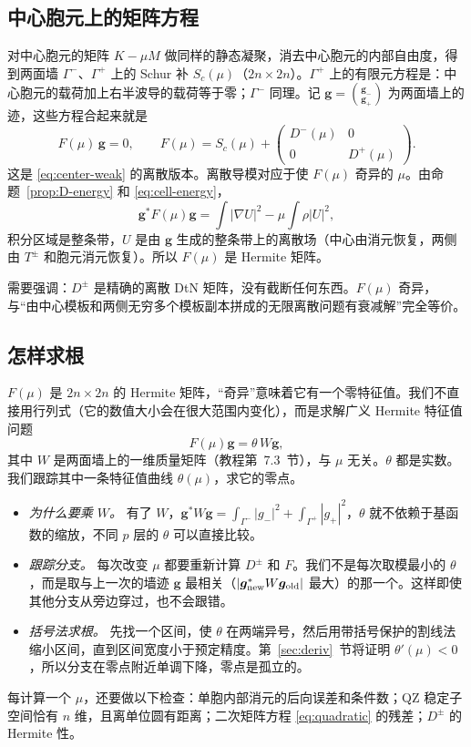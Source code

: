 \documentclass[11pt,a4paper,fontset=fandol]{ctexart}
\begin{document}
\subsection{中心胞元上的矩阵方程}

对中心胞元的矩阵 $K-\mu M$ 做同样的静态凝聚，消去中心胞元的内部自由度，得到两面墙 $\Gamma^-$、$\Gamma^+$ 上的 Schur 补 $S_c(\mu)$（$2n\times2n$）。$\Gamma^+$ 上的有限元方程是：中心胞元的载荷加上右半波导的载荷等于零；$\Gamma^-$ 同理。记 $\bm g=\binom{\bm g_-}{\bm g_+}$ 为两面墙上的迹，这些方程合起来就是
\begin{equation}
\label{eq:F}
F(\mu)\,\bm g=0,\qquad
F(\mu)=S_c(\mu)+\begin{pmatrix}D^-(\mu)&0\\0&D^+(\mu)\end{pmatrix}.
\end{equation}
这是 \eqref{eq:center-weak} 的离散版本。离散导模对应于使 $F(\mu)$ 奇异的 $\mu$。由命题~\ref{prop:D-energy} 和 \eqref{eq:cell-energy}，
\begin{equation}
\label{eq:F-energy}
\bm g^*F(\mu)\bm g=\int|\nabla U|^2-\mu\int\rho|U|^2 ,
\end{equation}
积分区域是整条带，$U$ 是由 $\bm g$ 生成的整条带上的离散场（中心由消元恢复，两侧由 $T^\pm$ 和胞元消元恢复）。所以 $F(\mu)$ 是 Hermite 矩阵。

需要强调：$D^\pm$ 是精确的离散 DtN 矩阵，没有截断任何东西。$F(\mu)$ 奇异，与“由中心模板和两侧无穷多个模板副本拼成的无限离散问题有衰减解”完全等价。

\subsection{怎样求根}
\label{sec:root}

$F(\mu)$ 是 $2n\times2n$ 的 Hermite 矩阵，“奇异”意味着它有一个零特征值。我们不直接用行列式（它的数值大小会在很大范围内变化），而是求解广义 Hermite 特征值问题
\begin{equation}
\label{eq:theta}
F(\mu)\bm g=\theta\,W\bm g ,
\end{equation}
其中 $W$ 是两面墙上的一维质量矩阵（教程第~7.3~节），与 $\mu$ 无关。$\theta$ 都是实数。我们跟踪其中一条特征值曲线 $\theta(\mu)$，求它的零点。

\begin{itemize}
\item \emph{为什么要乘 $W$。} 有了 $W$，$\bm g^*W\bm g=\int_{\Gamma^-}|g_-|^2+\int_{\Gamma^+}|g_+|^2$，$\theta$ 就不依赖于基函数的缩放，不同 $p$ 层的 $\theta$ 可以直接比较。
\item \emph{跟踪分支。} 每次改变 $\mu$ 都要重新计算 $D^\pm$ 和 $F$。我们不是每次取模最小的 $\theta$，而是取与上一次的墙迹 $\bm g$ 最相关（$|\bm g_{\rm new}^*W\bm g_{\rm old}|$ 最大）的那一个。这样即使其他分支从旁边穿过，也不会跟错。
\item \emph{括号法求根。} 先找一个区间，使 $\theta$ 在两端异号，然后用带括号保护的割线法缩小区间，直到区间宽度小于预定精度。第~\ref{sec:deriv}~节将证明 $\theta'(\mu)<0$，所以分支在零点附近单调下降，零点是孤立的。
\end{itemize}
每计算一个 $\mu$，还要做以下检查：单胞内部消元的后向误差和条件数；QZ 稳定子空间恰有 $n$ 维，且离单位圆有距离；二次矩阵方程 \eqref{eq:quadratic} 的残差；$D^\pm$ 的 Hermite 性。
\end{document}
